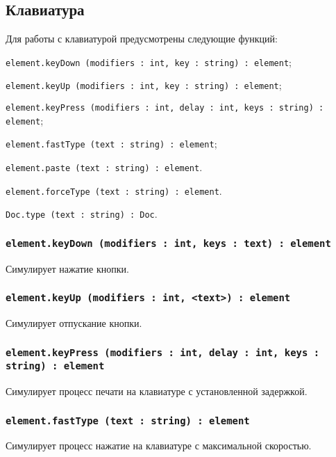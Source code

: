 \subsection{Клавиатура}

Для работы с клавиатурой предусмотрены следующие функций:
\begin{icItems}
	\item \lstinline|element.keyDown (modifiers : int, key : string) : element|;
	\item \lstinline|element.keyUp (modifiers : int, key : string) : element|;
	\item \lstinline|element.keyPress (modifiers : int, delay : int, keys : string) : element|;
	\item \lstinline|element.fastType (text : string) : element|;
	\item \lstinline|element.paste (text : string) : element|.
	\item \lstinline|element.forceType (text : string) : element|.
	\item \lstinline|Doc.type (text : string) : Doc|.
\end{icItems}

\subsubsection{\lstinline|element.keyDown (modifiers : int, keys : text) : element|}

Симулирует нажатие кнопки.

\subsubsection{\lstinline|element.keyUp (modifiers : int, <text>) : element|}

Симулирует отпускание кнопки.

\subsubsection{\lstinline|element.keyPress (modifiers : int, delay : int, keys : string) : element|}

Симулирует процесс печати на клавиатуре с установленной задержкой.

\subsubsection{\lstinline|element.fastType (text : string) : element|}

Симулирует процесс нажатие на клавиатуре с максимальной скоростью.

